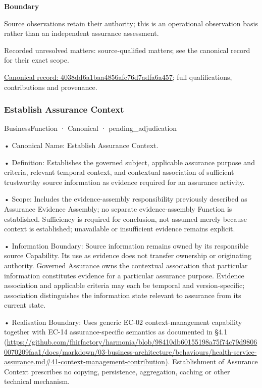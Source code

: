 \textbf{Boundary}



Source observations retain their authority; this is an operational observation basis rather than an independent assurance assessment.


{\small Recorded unresolved matters: source-qualified matters; see the canonical record for their exact scope.}\par
{\footnotesize \href{../../../../continuum/business/business-function/4038dd6a1baa4856afc76d7adfa6a457.md}{Canonical record: 4038dd6a1baa4856afc76d7adfa6a457}; full qualifications, contributions and provenance.}\par
\subsubsection{Establish Assurance Context}

\label{element:ffffe352e28c4e878d986b0e15ddff15}
{\small BusinessFunction · Canonical · pending\_adjudication}\par

•
Canonical Name: Establish Assurance Context.



•
Definition: Establishes the governed subject, applicable assurance purpose and criteria, relevant temporal context, and contextual association of sufficient trustworthy source information as evidence required for an assurance activity.



•
Scope: Includes the evidence-assembly responsibility previously described as Assurance Evidence Assembly; no separate evidence-assembly Function is established. Sufficiency is required for conclusion, not assumed merely because context is established; unavailable or insufficient evidence remains explicit.



•
Information Boundary: Source information remains owned by its responsible source Capability. Its use as evidence does not transfer ownership or originating authority. Governed Assurance owns the contextual association that particular information constitutes evidence for a particular assurance purpose. Evidence association and applicable criteria may each be temporal and version-specific; association distinguishes the information state relevant to assurance from its current state.



•
Realisation Boundary: Uses generic EC-02 context-management capability together with EC-14 assurance-specific semantics as documented in §4.1 (\url{https://github.com/fhirfactory/harmonia/blob/98410db60155198a75f74c79d98060070209faa1/docs/markdown/03-business-architecture/behaviours/health-service-assurance.md#41-context-management-contribution}). Establishment of Assurance Context prescribes no copying, persistence, aggregation, caching or other technical mechanism.



